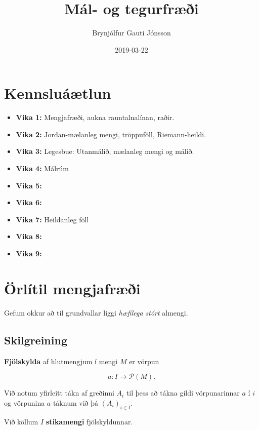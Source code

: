 \documentclass[]{book}
\title{Mál- og tegurfræði}
\author{Brynjólfur Gauti Jónsson}
\date{2019-03-22}
\begin{document}
\maketitle

{
\setcounter{tocdepth}{1}
\tableofcontents
}
\hypertarget{kennsluatlun}{%
\chapter*{Kennsluáætlun}\label{kennsluatlun}}

\begin{itemize}
\item
  \textbf{Vika 1:} Mengjafræði, aukna rauntalnalínan, raðir.
\item
  \textbf{Vika 2:} Jordan-mælanleg mengi, tröppuföll, Riemann-heildi.
\item
  \textbf{Vika 3:} Legesbue: Utanmálið, mælanleg mengi og málið.
\item
  \textbf{Vika 4:} Málrúm
\item
  \textbf{Vika 5:}
\item
  \textbf{Vika 6:}
\item
  \textbf{Vika 7:} Heildanleg föll
\item
  \textbf{Vika 8:}
\item
  \textbf{Vika 9:}
\end{itemize}

\hypertarget{orlitil-mengjafri}{%
\chapter{Örlítil mengjafræði}\label{orlitil-mengjafri}}

Gefum okkur að til grundvallar liggi \emph{hæfilega stórt} almengi.

\hypertarget{skilgreining}{%
\section{Skilgreining}\label{skilgreining}}

\textbf{Fjölskylda} af hlutmengjum í mengi \(M\) er vörpun

\[
a: I\rightarrow \mathcal P(M).
\]

Við notum yfirleitt tákn af greðinni \(A_i\) til þess að tákna gildi vörpunarinnar \(a\) í \(i\) og vörpunina \(a\) táknum við þá \((A_i)_{i\in I}\).

Við köllum \(I\) \textbf{stikamengi} fjölskyldunnar.
\end{document}
